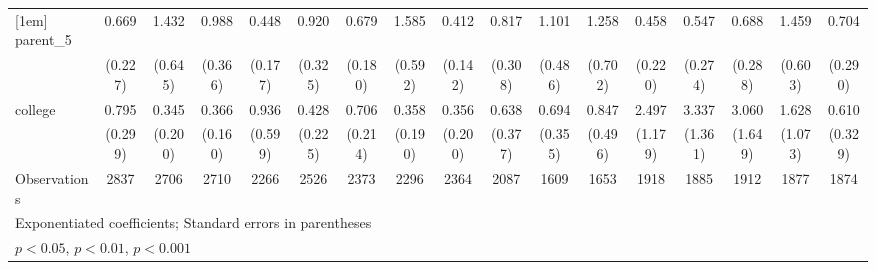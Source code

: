 {\begin{tabular}{l*{16}{c}}
[1em]
parent\_5            &       0.669         &       1.432         &       0.988         &       0.448\sym{*}  &       0.920         &       0.679         &       1.585         &       0.412\sym{*}  &       0.817         &       1.101         &       1.258         &       0.458         &       0.547         &       0.688         &       1.459         &       0.704         \\
                    &     (0.227)         &     (0.645)         &     (0.366)         &     (0.177)         &     (0.325)         &     (0.180)         &     (0.592)         &     (0.142)         &     (0.308)         &     (0.486)         &     (0.702)         &     (0.220)         &     (0.274)         &     (0.288)         &     (0.603)         &     (0.290)         \\
[1em]
college             &       0.795         &       0.345         &       0.366\sym{*}  &       0.936         &       0.428         &       0.706         &       0.358         &       0.356         &       0.638         &       0.694         &       0.847         &       2.497         &       3.337\sym{**} &       3.060\sym{*}  &       1.628         &       0.610         \\
                    &     (0.299)         &     (0.200)         &     (0.160)         &     (0.599)         &     (0.225)         &     (0.214)         &     (0.190)         &     (0.200)         &     (0.377)         &     (0.355)         &     (0.496)         &     (1.179)         &     (1.361)         &     (1.649)         &     (1.073)         &     (0.329)         \\
\hline
Observations        &        2837         &        2706         &        2710         &        2266         &        2526         &        2373         &        2296         &        2364         &        2087         &        1609         &        1653         &        1918         &        1885         &        1912         &        1877         &        1874         \\
\hline\hline
\multicolumn{17}{l}{\footnotesize Exponentiated coefficients; Standard errors in parentheses}\\
\multicolumn{17}{l}{\footnotesize \sym{*} \(p<0.05\), \sym{**} \(p<0.01\), \sym{***} \(p<0.001\)}\\
\end{tabular}
}
